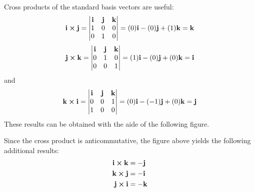 \documentclass[handout]{ximera}
\begin{document}
Cross products of the standard basis vectors are useful:
\[
\mathbf{i} \boldsymbol\times \mathbf{j}=
 \begin{vmatrix}
\mathbf{i} & \mathbf{j} & \mathbf{k}\\
1 & 0 & 0\\
0 & 1 & 0
\end{vmatrix}
= (0)\mathbf{i} - (0)\mathbf{j} + (1)\mathbf{k} = \mathbf{k}
\]
\[
\mathbf{j} \boldsymbol\times \mathbf{k}=
 \begin{vmatrix}
\mathbf{i} & \mathbf{j} & \mathbf{k}\\
0 & 1 & 0\\
0 & 0 & 1
\end{vmatrix}
= (1)\mathbf{i} - (0)\mathbf{j} + (0)\mathbf{k} = \mathbf{i}
\]
and
\[
\mathbf{k} \boldsymbol\times \mathbf{i}=
 \begin{vmatrix}
\mathbf{i} & \mathbf{j} & \mathbf{k}\\
0 & 0 & 1\\
1 & 0 & 0
\end{vmatrix}
= (0)\mathbf{i} - (-1)\mathbf{j} + (0)\mathbf{k} = \mathbf{j}
\]
These results can be obtained with the aide of the following figure.
\begin{image}
\end{image}

\begin{remark}
Since the cross product is anticommutative, the figure above yields the following additional results:
\begin{align*}
\mathbf{i} \boldsymbol\times \mathbf{k} &= \mathbf{-j}\\
\mathbf{k} \boldsymbol\times \mathbf{j} &= \mathbf{-i}\\
\mathbf{j} \boldsymbol\times \mathbf{i} &= \mathbf{-k}
\end{align*}
\end{remark}
\end{document}
